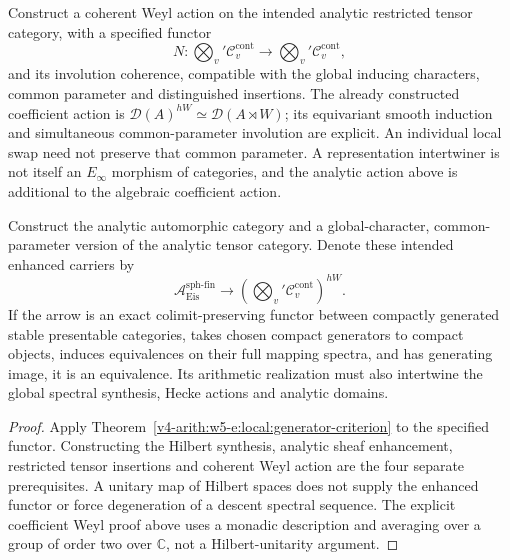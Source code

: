 \begin{conjecture}
\label{v4-arith:w6-d:prop:Weyl-coherent}
Construct a coherent Weyl action on the intended analytic restricted
tensor category, with a specified functor
\begin{equation}
\label{v4-arith:w6-d:eq:Weyl-coherent}
 N:\bigotimes_v'\mathcal C_v^{\mathrm{cont}}
 \longrightarrow\bigotimes_v'\mathcal C_v^{\mathrm{cont}},
\end{equation}
and its involution coherence, compatible with the global inducing
characters, common parameter and distinguished insertions.
The already constructed coefficient action is
$\mathcal D(A)^{hW}\simeq\mathcal D(A\rtimes W)$; its equivariant
smooth induction and simultaneous common-parameter involution are
explicit. An individual local swap need not preserve that common
parameter. A representation intertwiner is not itself an
$E_\infty$ morphism of categories, and the analytic action above is
additional to the algebraic coefficient action.
\end{conjecture}

\begin{theorem}
\label{v4-arith:w6-d:thm:PW-lift}
Construct the analytic automorphic category and a global-character,
common-parameter version of the analytic tensor category. Denote these
intended enhanced carriers by
\begin{equation}
\label{v4-arith:w6-d:eq:PW-lift}
 \mathcal A_{\mathrm{Eis}}^{\mathrm{sph\text{-}fin}}
 \longrightarrow
 \left(\bigotimes_v'\mathcal C_v^{\mathrm{cont}}\right)^{hW}.
\end{equation}
If the arrow is an exact colimit-preserving functor between compactly
generated stable presentable categories, takes chosen compact generators
to compact objects, induces equivalences on their full mapping spectra,
and has generating image, it is an equivalence. Its arithmetic
realization must also intertwine the global spectral synthesis,
Hecke actions and analytic domains.
\end{theorem}
\begin{proof}
Apply Theorem~\ref{v4-arith:w5-e:local:generator-criterion} to the
specified functor. Constructing the Hilbert synthesis, analytic
sheaf enhancement, restricted tensor insertions and coherent Weyl
action are the four separate prerequisites. A unitary map of Hilbert
spaces does not supply the enhanced functor or force degeneration of
a descent spectral sequence. The explicit coefficient Weyl proof
above uses a monadic description and averaging over a group of order
two over $\mathbb C$, not a Hilbert-unitarity argument.
\end{proof}

